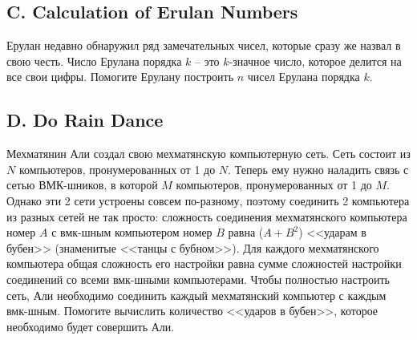 




\subsection*{C. Calculation of Erulan Numbers}

Ерулан недавно обнаружил ряд замечательных чисел, которые сразу же назвал в свою честь. Число Ерулана порядка $k$ -- это $k$-значное число, которое делится на все свои цифры. Помогите Ерулану построить $n$ чисел Ерулана порядка $k$.






\subsection*{D. Do Rain Dance}

Мехматянин Али создал свою мехматянскую компьютерную сеть. Сеть состоит из $N$ компьютеров, пронумерованных от 1 до $N$. Теперь ему нужно наладить связь с сетью ВМК-шников, в которой $M$ компьютеров, пронумерованных от 1 до $M$. Однако эти 2 сети устроены совсем по-разному, поэтому соединить 2 компьютера из разных сетей не так просто: сложность соединения мехматянского компьютера номер $A$ с вмк-шным компьютером номер $B$ равна ($A+B^2$) <<ударам в бубен>> (знаменитые <<танцы с бубном>>). Для каждого мехматянского компьютера общая сложность его настройки равна сумме сложностей настройки соединений со всеми вмк-шными компьютерами. Чтобы полностью настроить сеть, Али необходимо соединить каждый мехматянский компьютер с каждым вмк-шным. Помогите вычислить количество <<ударов в бубен>>, которое необходимо будет совершить Али.


